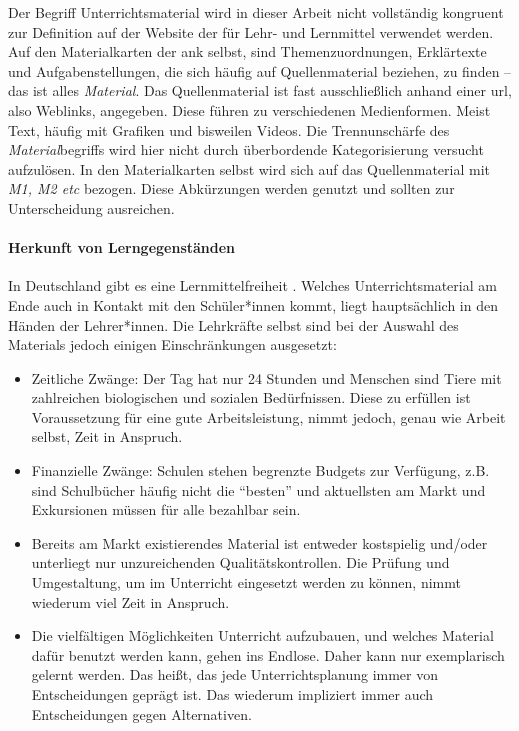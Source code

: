 Der Begriff Unterrichtsmaterial wird in dieser Arbeit nicht vollständig kongruent zur Definition auf der Website der \textcite{KMKMittel} für Lehr- und Lernmittel verwendet werden. Auf den Materialkarten der \gls{ank} selbst, sind Themenzuordnungen, Erklärtexte und Aufgabenstellungen, die sich häufig auf Quellenmaterial beziehen, zu finden -- das ist alles \emph{Material}. Das Quellenmaterial ist fast ausschließlich anhand einer \gls{url}, also Weblinks, angegeben. Diese führen zu verschiedenen Medienformen. Meist Text, häufig mit Grafiken und bisweilen Videos. Die Trennunschärfe des \emph{Material}begriffs wird hier nicht durch überbordende Kategorisierung versucht aufzulösen. In den Materialkarten selbst wird sich auf das Quellenmaterial mit \emph{M1, M2 \gls{etc}} bezogen. Diese Abkürzungen werden genutzt und sollten zur Unterscheidung ausreichen. 


\paragraph{Herkunft von Lerngegenständen} 
In Deutschland gibt es eine Lernmittelfreiheit \autocite[]{KMKMittel}.
Welches Unterrichtsmaterial am Ende auch in Kontakt mit den Schüler*innen kommt, liegt hauptsächlich in den Händen der Lehrer*innen.
Die Lehrkräfte selbst sind bei der Auswahl des Materials jedoch einigen Einschränkungen ausgesetzt:
\begin{itemize}
    \item Zeitliche Zwänge: Der Tag hat nur 24 Stunden und Menschen sind Tiere mit zahlreichen biologischen und sozialen Bedürfnissen. Diese zu erfüllen ist Voraussetzung für eine gute Arbeitsleistung, nimmt jedoch, genau wie Arbeit selbst, Zeit in Anspruch. 
    \item Finanzielle Zwänge: Schulen stehen begrenzte Budgets zur Verfügung, z.B. sind Schulbücher häufig nicht die \enquote{besten} und aktuellsten am Markt und Exkursionen müssen für alle bezahlbar sein. 
    \item Bereits am Markt existierendes Material ist entweder kostspielig und/oder unterliegt nur unzureichenden Qualitätskontrollen. Die Prüfung und Umgestaltung, um im Unterricht eingesetzt werden zu können, nimmt wiederum viel Zeit in Anspruch. 
    \item Die vielfältigen Möglichkeiten Unterricht aufzubauen, und welches Material dafür benutzt werden kann, gehen ins Endlose. Daher kann nur exemplarisch gelernt werden. Das heißt, das jede Unterrichtsplanung immer von Entscheidungen geprägt ist. Das wiederum impliziert immer auch Entscheidungen gegen Alternativen.
\end{itemize}


